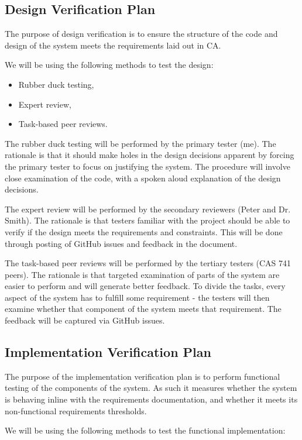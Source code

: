 \documentclass[12pt, titlepage]{article}
\begin{document}
\subsection{Design Verification Plan}
The purpose of design verification is to ensure the structure of the code and 
design of the system meets the requirements laid out in CA.

We will be using the following methods to test the design:

\begin{itemize}
	\item Rubber duck testing,
	\item Expert review,
	\item Task-based peer reviews.
\end{itemize}

The rubber duck testing will be performed by the primary tester (me). The 
rationale is that it should make holes in the design decisions apparent by 
forcing the primary tester to focus on justifying the system. The procedure 
will involve close examination of the code, with a spoken aloud explanation of 
the design decisions.

The expert review will be performed by the secondary reviewers (Peter and Dr. 
Smith). The rationale is that testers familiar with the project should be able 
to verify if the design meets the requirements and constraints. This will be 
done through posting of GitHub issues and feedback in the document.

The task-based peer reviews will be performed by the tertiary testers (CAS 741 
peers). The rationale is that targeted examination of parts of the system are 
easier to perform and will generate better feedback. To divide the tasks, every 
aspect of the system has to fulfill some requirement - the testers will then 
examine whether that component of the system meets that requirement. The 
feedback will be captured via GitHub issues.

\subsection{Implementation Verification Plan}
The purpose of the implementation verification plan is to perform functional 
testing of the components of the system. As such it measures whether the system 
is behaving inline with the requirements documentation, and whether it meets 
its non-functional requirements thresholds.

We will be using the following methods to test the functional implementation:
\end{document}
